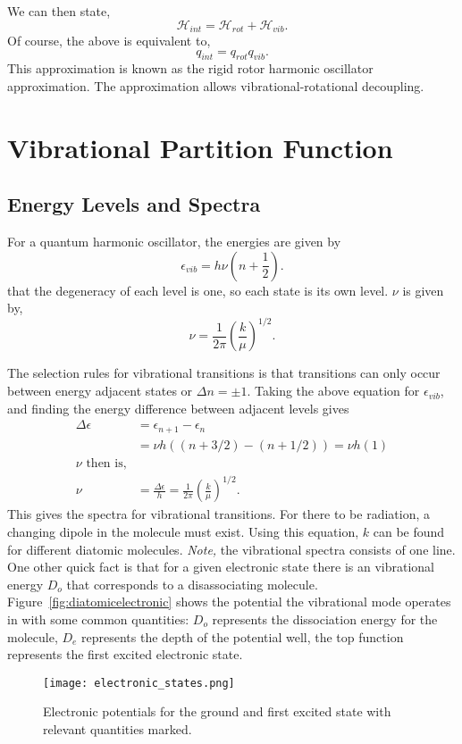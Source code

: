 We can then state,
\begin{equation*}
	\mathcal{H}_{int} = \mathcal{H}_{rot} + \mathcal{H}_{vib}.
\end{equation*}
Of course, the above is equivalent to,
\begin{equation*}
	q_{int} = q_{rot}q_{vib}.
\end{equation*}
This approximation is known as the rigid rotor harmonic oscillator
approximation. The approximation allows vibrational-rotational decoupling.

\section{Vibrational Partition Function}%
\label{sec:vib}
\subsection{Energy Levels and Spectra}
For a quantum harmonic oscillator, the energies are given by
\begin{equation*}
	\epsilon_{vib} = h\nu(n+ \frac{1}{2}).
\end{equation*}
\note that the degeneracy of each level is one, so each state is its
own level. $\nu$ is given by,
\begin{equation*}
	\nu = \frac{1}{2\pi} \left(\frac{k}{\mu}\right)^{1/2}.
\end{equation*}

The selection rules for vibrational transitions is that transitions can only
occur between energy adjacent states or $\Delta n = \pm 1$. Taking the above
equation for $\epsilon_{vib}$, and finding the energy difference between
adjacent levels gives
\begin{align*}
	\Delta\epsilon &= \epsilon_{n+1} - \epsilon_{n}\\
				   &= \nu h ((n + 3/2) - (n + 1/2)) = \nu h (1)\\
				   \nu\text{ then is,}\\
	\nu &= \frac{\Delta\epsilon}{h} =
	\frac{1}{2\pi}\left(\frac{k}{\mu}\right)^{1/2}.
\end{align*}
This gives the spectra for vibrational transitions. For there to be radiation, a
changing dipole in the molecule must exist. Using this equation, $k$ can be
found for different diatomic molecules. \textit{Note,} the vibrational spectra
consists of one line. One other quick fact is that for a given electronic state
there is an vibrational energy $D_o$ that corresponds to a disassociating
molecule. Figure~\ref{fig:diatomicelectronic} shows the potential the
vibrational mode operates in with some common quantities: $D_o$ represents the
dissociation energy for the molecule, $D_e$ represents the depth of the
potential well, the top function represents the first excited electronic state.
\begin{figure}[htpb]
	\centering
	\texttt{[image: electronic\_states.png]}
	\caption{Electronic potentials for the ground and first excited state with
	relevant quantities marked.}
	\label{fig:elecronic_states}
\end{figure}

